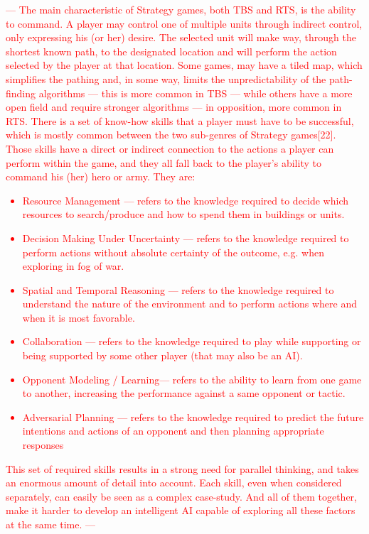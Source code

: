 \textcolor{red}{---
The main characteristic of Strategy games, both TBS and RTS, is the ability to command. 
A player may control one of multiple units through indirect control, only expressing his (or her) desire. 
The selected unit will make way, through the shortest known path, 
to the designated location and will perform the action selected by the player at that location. 
Some games, may have a tiled map, which simplifies the pathing and, in some way, 
limits the unpredictability of the path-finding algorithms 
— this is more common in TBS — 
while others have a more open field and require stronger algorithms — in opposition, more common in RTS. 
There is a set of know-how skills that a player must have to be successful, 
which is mostly common between the two sub-genres of Strategy games[22]. 
Those skills have a direct or indirect connection to the actions a player can perform within the game, 
and they all fall back to the player’s ability to command his (her) hero or army. 
They are:
\begin{itemize}
    \item Resource Management — refers to the knowledge required to decide which resources to search/produce and how to spend them in buildings or units.
    \item Decision Making Under Uncertainty — refers to the knowledge required to perform actions without absolute certainty of the outcome, e.g. when exploring in fog of war.
    \item Spatial and Temporal Reasoning — refers to the knowledge required to understand the nature of the environment and to perform actions where and when it is most favorable.
    \item Collaboration — refers to the knowledge required to play while supporting or being supported by some other player (that may also be an AI).
    \item Opponent Modeling / Learning— refers to the ability to learn from one game to another, increasing the performance against a same opponent or tactic.
    \item Adversarial Planning — refers to the knowledge required to predict the future intentions and actions of an opponent and then planning appropriate responses
\end{itemize}
This set of required skills results in a strong need for parallel thinking, 
and takes an enormous amount of detail into account. 
Each skill, even when considered separately, can easily be seen as a complex case-study. 
And all of them together, make it harder to develop an intelligent AI capable of exploring all these factors at the same time.
---}
